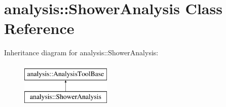 \hypertarget{classanalysis_1_1ShowerAnalysis}{}\section{analysis\+:\+:Shower\+Analysis Class Reference}
\label{classanalysis_1_1ShowerAnalysis}
Inheritance diagram for analysis\+:\+:Shower\+Analysis\+:\begin{figure}[H]
\begin{center}
\leavevmode
\includegraphics[height=2.000000cm]{classanalysis_1_1ShowerAnalysis}
\end{center}
\end{figure}
